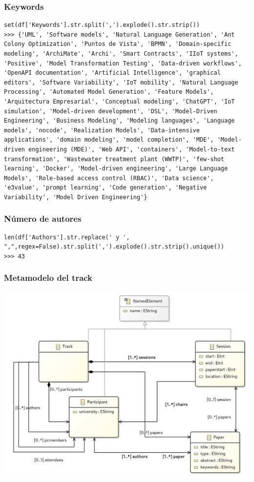 \begin{frame}[fragile]
  \frametitle{Keywords}
\begin{lstlisting}
set(df['Keywords'].str.split(',').explode().str.strip())
>>> {'UML', 'Software models', 'Natural Language Generation', 'Ant Colony Optimization', 'Puntos de Vista', 'BPMN', 'Domain-specific modeling', 'ArchiMate', 'Archi', 'Smart Contracts', 'IIoT systems', 'Positive', 'Model Transformation Testing', 'Data-driven workflows', 'OpenAPI documentation', 'Artificial Intelligence', 'graphical editors', 'Software Variability', 'IoT mobility', 'Natural Language Processing', 'Automated Model Generation', 'Feature Models', 'Arquitectura Empresarial', 'Conceptual modeling', 'ChatGPT', 'IoT simulation', 'Model-driven development', 'DSL', 'Model-Driven Engineering', 'Business Modeling', 'Modeling languages', 'Language models', 'nocode', 'Realization Models', 'Data-intensive applications', 'domain modeling', 'model completion', 'MDE', 'Model-driven engineering (MDE)', 'Web API', 'containers', 'Model-to-text transformation', 'Wastewater treatment plant (WWTP)', 'few-shot learning', 'Docker', 'Model-driven engineering', 'Large Language Models', 'Role-based access control (RBAC)', 'Data science', 'e3value', 'prompt learning', 'Code generation', 'Negative Variability', 'Model Driven Engineering'}
\end{lstlisting}

\end{frame}


\begin{frame}[fragile]
  \frametitle{Número de autores}
\begin{lstlisting}[basicstyle=\large\tt]
len(df['Authors'].str.replace(' y ', ",",regex=False).str.split(',').explode().str.strip().unique())
>>> 43
\end{lstlisting}
\end{frame}


\begin{frame}
  \frametitle{Metamodelo del track}
\centering\includegraphics[height=.9\textheight]{img/IsdmTrack}
\end{frame}

